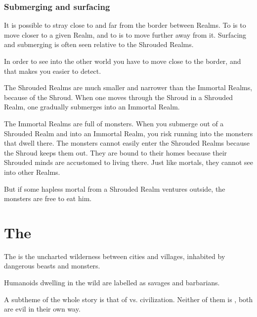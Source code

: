 \subsubsection{Submerging and surfacing}
It is possible to stray close to and far from the border between Realms. 
To  is to move closer to a given Realm, and to  is to move further away from it. 
Surfacing and submerging is often seen relative to the Shrouded Realms. 

In order to see into the other world you have to move close to the border, and that makes you easier to detect. 

The Shrouded Realms are much smaller and narrower than the Immortal Realms, because of the Shroud. 
When one moves  through the Shroud in a Shrouded Realm, one gradually submerges into an Immortal Realm. 

The Immortal Realms are full of monsters. 
When you submerge out of a Shrouded Realm and into an Immortal Realm, you risk running into the monsters that dwell there. 
The monsters cannot easily enter the Shrouded Realms because the Shroud keeps them out. 
They are bound to their homes because their Shrouded minds are accustomed to living there. 
Just like mortals, they cannot see into other Realms. 

But if some hapless mortal from a Shrouded Realm ventures outside, the monsters are free to eat him. 














\section{The \Wylde}
The \Wylde{} is the uncharted wilderness between cities and villages, inhabited by dangerous beasts and monsters. 

Humanoids dwelling in the wild are labelled as savages and barbarians. 

A subtheme of the whole story is that of \Wylde{} vs. civilization. Neither of them is , both are evil in their own way. 


